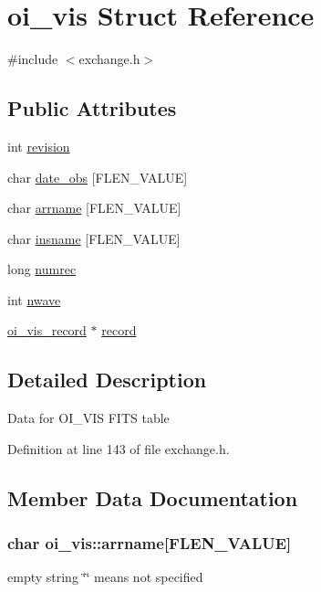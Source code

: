 \hypertarget{structoi__vis}{
\section{oi\_\-vis Struct Reference}
\label{structoi__vis}
}


{\ttfamily \#include $<$exchange.h$>$}

\subsection*{Public Attributes}
\begin{DoxyCompactItemize}
\item 
int \hyperlink{structoi__vis_a2c32fac61ef27632bc82f0e4a19948ce}{revision}
\item 
char \hyperlink{structoi__vis_a8ba69c3cd63603e023569e6dc76421ba}{date\_\-obs} \mbox{[}FLEN\_\-VALUE\mbox{]}
\item 
char \hyperlink{structoi__vis_a7ff00d597e918cac5e6861296b8ff7d9}{arrname} \mbox{[}FLEN\_\-VALUE\mbox{]}
\item 
char \hyperlink{structoi__vis_a03ba94c11949483f9e7cbee002f3753f}{insname} \mbox{[}FLEN\_\-VALUE\mbox{]}
\item 
long \hyperlink{structoi__vis_a9860977352b5c18a6feb1556c34b17fe}{numrec}
\item 
int \hyperlink{structoi__vis_a46c9e48253d148a7fcd0b00256058ca2}{nwave}
\item 
\hyperlink{structoi__vis__record}{oi\_\-vis\_\-record} $\ast$ \hyperlink{structoi__vis_ae757f8004281973686de5e6eb28e7f56}{record}
\end{DoxyCompactItemize}


\subsection{Detailed Description}
Data for OI\_\-VIS FITS table 

Definition at line 143 of file exchange.h.



\subsection{Member Data Documentation}
\hypertarget{structoi__vis_a7ff00d597e918cac5e6861296b8ff7d9}{
\subsubsection[{arrname}]{\setlength{\rightskip}{0pt plus 5cm}char {\bf oi\_\-vis::arrname}\mbox{[}FLEN\_\-VALUE\mbox{]}}}
\label{structoi__vis_a7ff00d597e918cac5e6861296b8ff7d9}
empty string \char`\"{}\char`\"{} means not specified 

